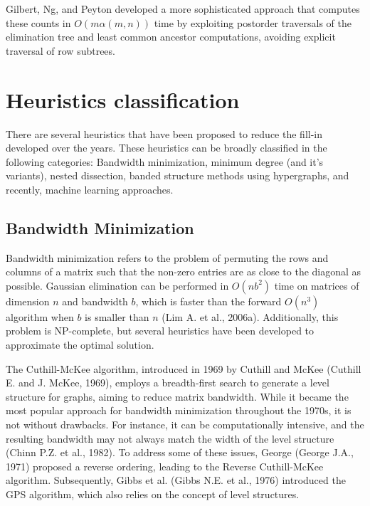 Gilbert, Ng, and Peyton developed a more sophisticated approach that computes these counts in $O(m\alpha(m,n))$ time by exploiting postorder traversals of the elimination tree and least common ancestor computations, avoiding explicit traversal of row subtrees.




\section{Heuristics classification}
\label{sec:heuristics}

There are several heuristics that have been proposed to reduce the fill-in developed over the years. These heuristics can be broadly classified in the following categories: Bandwidth minimization, minimum degree (and it's variants), nested dissection, banded structure methods using hypergraphs, and recently, machine learning approaches. 

\subsection{Bandwidth Minimization}

Bandwidth minimization refers to the problem of permuting the rows and columns of a matrix such that the non-zero entries are as close to the diagonal as possible.  Gaussian elimination can be performed in $O(nb^2)$ time on matrices of dimension $n$ and bandwidth $b$, which is faster than the forward $O(n^3)$ algorithm when $b$ is smaller than $n$ (Lim A. et al., 2006a).  Additionally, this problem is NP-complete, but several heuristics have been developed to approximate the optimal solution.

The Cuthill-McKee algorithm, introduced in 1969 by Cuthill and McKee (Cuthill E. and J. McKee, 1969), employs a breadth-first search to generate a level structure for graphs, aiming to reduce matrix bandwidth. While it became the most popular approach for bandwidth minimization throughout the 1970s, it is not without drawbacks. For instance, it can be computationally intensive, and the resulting bandwidth may not always match the width of the level structure (Chinn P.Z. et al., 1982). To address some of these issues, George (George J.A., 1971) proposed a reverse ordering, leading to the Reverse Cuthill-McKee algorithm. Subsequently, Gibbs et al. (Gibbs N.E. et al., 1976) introduced the GPS algorithm, which also relies on the concept of level structures.

